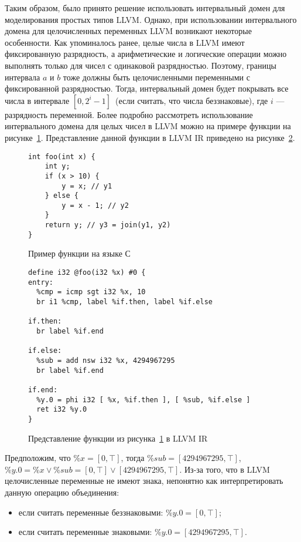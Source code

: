 Таким образом, было принято решение использовать интервальный домен для 
моделирования простых типов LLVM. Однако, при использовании интервального 
домена для целочисленных переменных LLVM возникают некоторые особенности. Как 
упоминалось ранее, целые числа в LLVM имеют фиксированную разрядность, а 
арифметические и логические операции можно выполнять только для чисел с 
одинаковой разрядностью. Поэтому, границы интервала $a$ и $b$ тоже должны быть 
целочисленными переменными с фиксированной разрядностью. Тогда, интервальный 
домен будет покрывать все числа в интервале $[0, 2^i - 1]$~(если считать, что 
числа беззнаковые), где $i$ --- разрядность переменной. Более подробно 
рассмотреть использование интервального домена для целых чисел в LLVM можно на 
примере функции на рисунке~\ref{lst:funcC}. Представление данной функции в 
LLVM IR приведено на рисунке~\ref{lst:funcLLVM}.

\begin{figure}[h!]
\begin{lstlisting}[style=c]
int foo(int x) {
    int y;
    if (x > 10) {
        y = x; // y1
    } else {
        y = x - 1; // y2
    }
    return y; // y3 = join(y1, y2)
}
\end{lstlisting}
\caption{Пример функции на языке С}
\label{lst:funcC}
\end{figure}

\begin{figure}[h!]
\begin{lstlisting}[style=llvm]
define i32 @foo(i32 %x) #0 {
entry:
  %cmp = icmp sgt i32 %x, 10
  br i1 %cmp, label %if.then, label %if.else

if.then:
  br label %if.end

if.else:
  %sub = add nsw i32 %x, 4294967295
  br label %if.end

if.end:
  %y.0 = phi i32 [ %x, %if.then ], [ %sub, %if.else ]
  ret i32 %y.0
}
\end{lstlisting}
\caption{Представление функции из рисунка~\ref{lst:funcC} в LLVM IR}
\label{lst:funcLLVM}
\end{figure}

Предположим, что $\%x = [0, \top]$, тогда $\%sub = [4294967295, \top]$, $\%y.0 = 
\%x \vee \%sub = [0, \top] \vee [4294967295, \top]$. Из-за того, что в LLVM 
целочисленные переменные не имеют знака, непонятно как интерпретировать данную
операцию объединения:
\begin{itemize}
\item если считать переменные беззнаковыми: $\%y.0 = [0, \top]$;
\item если считать переменные знаковыми: $\%y.0 = [4294967295, \top]$.
\end{itemize}

